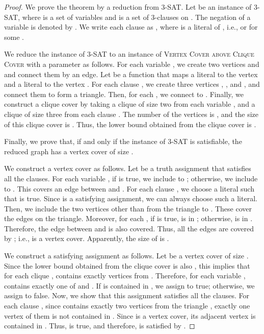 \documentclass[11pt]{article}
\begin{document}
\begin{proof}
We prove the theorem by a reduction from \textsc{3-SAT}.
Let  be an instance of \textsc{3-SAT},
where  is a set of variables and  is a set of 3-clauses on
.
The negation of a variable  is denoted by .
We write each clause  as , where  is a literal of , i.e.,
 or  for some .

We reduce the instance of \textsc{3-SAT} to an instance of \textsc{Vertex Cover above Clique Cover} with a
parameter  as follows.
For each variable , we create two vertices  and  and connect them by an edge.
Let  be a function that maps a literal  to the vertex  and a literal  to the vertex .
For each clause , we create three vertices , ,
and , and connect them to form a triangle.
Then, for each , we connect  to .
Finally, we construct a clique cover  by taking a clique  of size two from each
variable , and a clique  of size three from each clause .
The number of the vertices is , and the size of this clique cover is .
Thus, the lower bound obtained from the clique cover is .

Finally, we prove that, if and only if the instance of \textsc{3-SAT} is satisfiable, the reduced graph has a vertex
cover of size .


We construct a vertex cover  as follows.
Let  be a truth assignment that satisfies all the clauses.
For each variable , if  is true, we include  to ; otherwise, we include
 to .
This covers an edge between  and .
For each clause , we choose a literal  such that  is true.
Since  is a satisfying assignment, we can always choose such a literal.
Then, we include the two vertices other than  from the triangle  to .
These cover the edges on the triangle.
Moreover, for each , if  is true,  is in ; otherwise,  is in .
Therefore, the edge between  and  is also covered.
Thus, all the edges are covered by ; i.e.,  is a vertex cover.
Apparently, the size of  is .


We construct a satisfying assignment  as follows.
Let  be a vertex cover of size .
Since the lower bound obtained from the clique cover  is also , this implies that for each clique
,  contains exactly  vertices from .
Therefore, for each variable ,  contains exactly one of  and .
If  is contained in , we assign  to true; otherwise, we assign  to false.
Now, we show that this assignment  satisfies all the clauses.
For each clause , since  contains exactly two vertices from the triangle
, exactly one vertex  of them is not contained in .
Since  is a vertex cover, its adjacent vertex  is contained in .
Thus,  is true, and therefore,  is satisfied by .
\end{proof}
\end{document}
